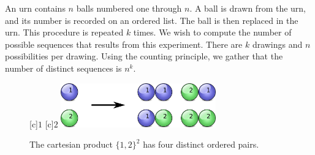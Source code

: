 \begin{example}
An urn contains $n$ balls numbered one through $n$.
A ball is drawn from the urn, and its number is recorded on an ordered list.
The ball is then replaced in the urn.
This procedure is repeated $k$ times.
We wish to compute the number of possible sequences that results from this experiment.
There are $k$ drawings and $n$ possibilities per drawing.
Using the counting principle, we gather that the number of distinct sequences is $n^k$.

\begin{figure}[htb!]
\begin{center}
\begin{psfrags}
[c]{$1$}
[c]{$2$}
\includegraphics[height=1.91cm]{Figures/4Chapter/sequences}
\end{psfrags}
\caption{The cartesian product $\{ 1, 2 \}^2$ has four distinct ordered pairs.}
\label{figure:Sequences}
\end{center}
\end{figure}
\end{example}

